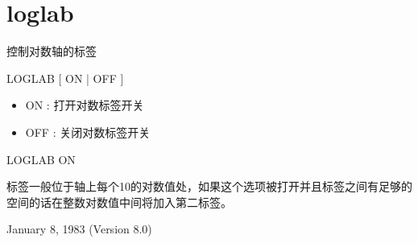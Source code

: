 \section{loglab}
\label{cmd:loglab}

控制对数轴的标签

LOGLAB [ ON | OFF ]

\begin{itemize}
\item ON : 打开对数标签开关 
\item OFF : 关闭对数标签开关 
\end{itemize}

LOGLAB ON

标签一般位于轴上每个10的对数值处，如果这个选项被打开并且标签之间有足够的空间的话在整数对数值中间将加入第二标签。

January 8, 1983 (Version 8.0)
